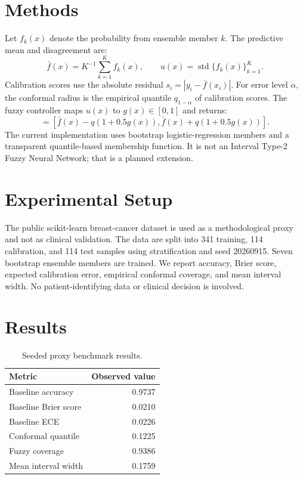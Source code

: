 \documentclass[sigconf]{acmart}
\begin{document}
\section{Methods}
Let $f_k(x)$ denote the probability from ensemble member $k$. The predictive mean and disagreement are:
\begin{equation}
\bar f(x)=K^{-1}\sum_{k=1}^K f_k(x),\qquad u(x)=\operatorname{std}\{f_k(x)\}_{k=1}^K.
\end{equation}
Calibration scores use the absolute residual $s_i=|y_i-\bar f(x_i)|$. For error level $\alpha$, the conformal radius is the empirical quantile $q_{1-\alpha}$ of calibration scores. The fuzzy controller maps $u(x)$ to $g(x)\in[0,1]$ and returns:
\begin{equation}
 [\ell(x),r(x)]=[\bar f(x)-q(1+0.5g(x)),\bar f(x)+q(1+0.5g(x))].
\end{equation}
The current implementation uses bootstrap logistic-regression members and a transparent quantile-based membership function. It is not an Interval Type-2 Fuzzy Neural Network; that is a planned extension.

\section{Experimental Setup}
The public scikit-learn breast-cancer dataset is used as a methodological proxy and not as clinical validation. The data are split into 341 training, 114 calibration, and 114 test samples using stratification and seed 20260915. Seven bootstrap ensemble members are trained. We report accuracy, Brier score, expected calibration error, empirical conformal coverage, and mean interval width. No patient-identifying data or clinical decision is involved.

\section{Results}
\begin{table}[h]
\centering
\caption{Seeded proxy benchmark results.}
\begin{tabular}{lr}
\toprule
Metric & Observed value \\
\midrule
Baseline accuracy & 0.9737 \\
Baseline Brier score & 0.0210 \\
Baseline ECE & 0.0226 \\
Conformal quantile & 0.1225 \\
Fuzzy coverage & 0.9386 \\
Mean interval width & 0.1759 \\
\bottomrule
\end{tabular}
\end{table}
\end{document}
